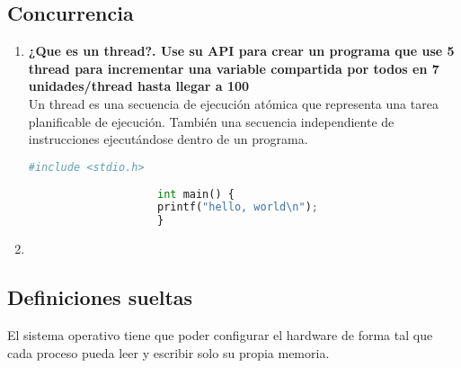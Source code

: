 \documentclass[../main.tex]{subfiles}
\begin{document}
    \subsection{Concurrencia}
        \begin{enumerate}
            \item 
                \textbf{¿Que es un thread?. Use su API para crear un programa que use 5 thread para incrementar una  variable compartida por todos en 7 unidades/thread hasta llegar a 100}\\
                Un thread es una secuencia de ejecución atómica que representa una tarea planificable de ejecución. También una secuencia independiente de instrucciones ejecutándose dentro de un programa.
                
                \begin{lstlisting}[language=Python, caption=hola mundo.]
                    #include <stdio.h>
        
                    int main() {
                    printf("hello, world\n");
                    }
                \end{lstlisting}
            \item
        \end{enumerate}

        
    \subsection{Definiciones sueltas}
        El sistema operativo tiene que poder configurar el hardware de forma tal que cada proceso pueda leer y escribir solo su propia memoria.
\end{document}
